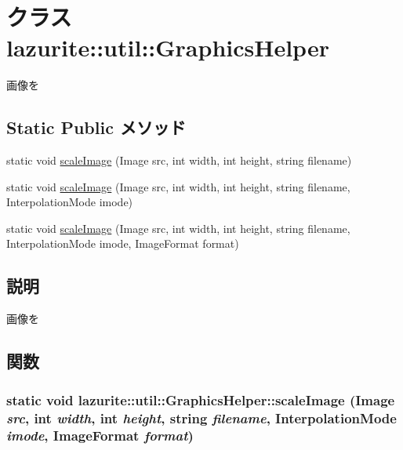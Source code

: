 \hypertarget{classlazurite_1_1util_1_1_graphics_helper}{
\section{クラス lazurite::util::GraphicsHelper}
\label{classlazurite_1_1util_1_1_graphics_helper}
}


画像を  
\subsection*{Static Public メソッド}
\begin{DoxyCompactItemize}
\item 
static void \hyperlink{classlazurite_1_1util_1_1_graphics_helper_ae81d97bf1fcc237baad9795b6b97f478}{scaleImage} (Image src, int width, int height, string filename)
\item 
static void \hyperlink{classlazurite_1_1util_1_1_graphics_helper_ae717350422eda3c2ca29c44fbe008d2d}{scaleImage} (Image src, int width, int height, string filename, InterpolationMode imode)
\item 
static void \hyperlink{classlazurite_1_1util_1_1_graphics_helper_a9968cf4ddb602b0b45a606a8bfc60442}{scaleImage} (Image src, int width, int height, string filename, InterpolationMode imode, ImageFormat format)
\end{DoxyCompactItemize}


\subsection{説明}
画像を 

\subsection{関数}
\hypertarget{classlazurite_1_1util_1_1_graphics_helper_a9968cf4ddb602b0b45a606a8bfc60442}{
\subsubsection[{scaleImage}]{\setlength{\rightskip}{0pt plus 5cm}static void lazurite::util::GraphicsHelper::scaleImage (Image {\em src}, \/  int {\em width}, \/  int {\em height}, \/  string {\em filename}, \/  InterpolationMode {\em imode}, \/  ImageFormat {\em format})}}
\label{classlazurite_1_1util_1_1_graphics_helper_a9968cf4ddb602b0b45a606a8bfc60442}

